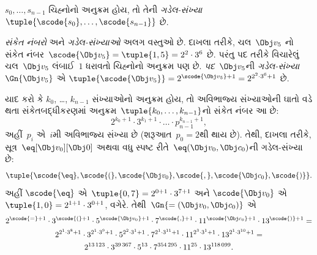 \documentclass[../../../include/open-logic-section]{subfiles}
\begin{document}
\begin{defn}
$s_0, \dots, s_{n-1}$ ચિહ્નોનો અનુક્રમ
હોય, તો તેની \emph{ગડેલ-સંખ્યા}
$\tuple{\scode{s_0}, \dots, \scode{s_{n-1}}}$ છે.
\end{defn}

\begin{explain}
\emph{સંકેત નંબરો} અને \emph{ગડેલ-સંખ્યાઓ}
અલગ વસ્તુઓ છે. દાખલા તરીકે, ચલ~$\Obj v_5$
નો સંકેત નંબર~$\scode{\Obj
  v_5} = \tuple{1, 5} = 2^2\cdot 3^6$ છે.
પરંતુ પદ તરીકે વિચારેલું ચલ~$\Obj v_5$
લંબાઈ~$1$ ધરાવતો ચિહ્નોનો અનુક્રમ પણ
છે. \emph{પદ}~$\Obj v_5$ની
\emph{ગડેલ-સંખ્યા}~$\Gn{\Obj v_5}$ એ
$\tuple{\scode{\Obj v_5}} = 2^{\scode{\Obj
    v_5} + 1} = 2^{2^2\cdot 3^6 + 1}$ છે.
\end{explain}

\begin{ex}
યાદ કરો કે $k_0$, \dots, $k_{n-1}$
સંખ્યાઓનો અનુક્રમ હોય, તો અવિભાજ્ય
સંખ્યાઓની ઘાતો વડે થતા સંકેતબદ્ધીકરણમાં
અનુક્રમ~$\tuple{k_0, \dots, k_{n-1}}$નો
સંકેત નંબર આ છે:
\[
2^{k_0+1}\cdot3^{k_1+1}\cdot \dots \cdot p_{n-1}^{k_{n-1}+1},
\]
અહીં~$p_i$ એ~$i$મી અવિભાજ્ય સંખ્યા છે
(શરૂઆત~$p_0 = 2$થી થાય છે). તેથી,
દાખલા તરીકે, સૂત્ર~$\eq[\Obj v_0][\Obj 0]$
અથવા વધુ સ્પષ્ટ રીતે~${\eq}(\Obj v_0,\Obj c_0)$ની
ગડેલ-સંખ્યા છે:
\[
\tuple{\scode{\eq},\scode{(},\scode{\Obj v_0},\scode{,}, \scode{\Obj
    c_0},\scode{)}}.
\]
અહીં $\scode{\eq}$ એ~$\tuple{0,7} = 2^{0+1}\cdot
3^{7+1}$ અને $\scode{\Obj v_0}$ એ~$\tuple{1,0} = 2^{1+1}\cdot3^{0+1}$,
વગેરે. તેથી~$\Gn{=(\Obj v_0,\Obj c_0)}$ એ
\begin{multline*}
2^{\scode{=} + 1}\cdot 3^{\scode{(}+1}\cdot 5^{\scode{\Obj v_0}+1}
\cdot 7^{\scode{,} + 1} \cdot 11^{\scode{\Obj c_0}+1} \cdot
13^{\scode{)}+1} = \\
2^{2^1\cdot 3^8 + 1}\cdot 3^{2^1\cdot 3^9+1}\cdot 5^{2^2\cdot 3^1+1}
\cdot 7^{2^1\cdot 3^{11} + 1} \cdot 11^{2^3\cdot3^1+1} \cdot
13^{2^1\cdot3^{10}+1} = \\
2^{13\,123}\cdot 3^{39\,367}\cdot 5^{13}\cdot 7^{354\,295}\cdot11^{25}\cdot13^{118\,099}.
\end{multline*}
\end{ex}
\end{document}
